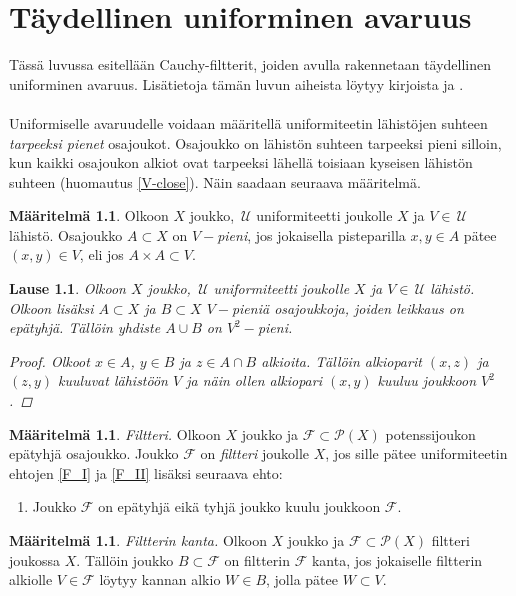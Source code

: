 \documentclass[12pt,a4paper,leqno]{report}
\newcommand{\U}{\,\mathcal{U}}
\newcommand{\Pot}{\mathcal{P}}
\newcommand{\F}{\mathcal{F}}
\theoremstyle{plain}
\newtheorem{lause}[equation]{Lause}
\theoremstyle{definition}
\newtheorem{maar}[equation]{Määritelmä}
\theoremstyle{remark}
\begin{document}
\chapter{Täydellinen uniforminen avaruus}
Tässä luvussa esitellään Cauchy-filtterit, joiden avulla rakennetaan täydellinen uniforminen avaruus.
Lisätietoja tämän luvun aiheista löytyy kirjoista 
\cite[luku~II]{Eom1} ja \cite[luku~IX]{Eom2}.
\\
\\
Uniformiselle avaruudelle voidaan määritellä 
uniformiteetin lähistöjen suhteen \emph{tarpeeksi pienet} osa\-jou\-kot. 
Osajoukko on lähistön suhteen tarpeeksi pieni silloin, 
kun kaikki osa\-jou\-kon alkiot ovat 
tarpeeksi lähellä toisiaan kyseisen lähistön suhteen (huomautus \ref{V-close}). 
Näin saadaan seuraava määritelmä.
\begin{maar}
Olkoon $X$ joukko, $\U$ uniformiteetti joukolle $X$ ja $V\in\U$ lähistö. 
Osajoukko $A\subset X$ on \emph{$V-$pieni}, jos 
jokaisella pisteparilla $x,y\in A$ pätee $(x,y)\in V$, eli jos $A\times A\subset V$.
\end{maar}
\begin{lause}
Olkoon $X$ joukko, $\U$ uniformiteetti joukolle $X$ ja $V\in\U$ lähistö. 
Olkoon lisäksi $A\subset X$ ja $B\subset X$ $V-$pieniä osajoukkoja, 
joiden leikkaus on epätyhjä. 
Tällöin yhdiste $A\cup B$ on $V^2-$pieni.
\begin{proof}
Olkoot $x\in A$, $y\in B$ ja $z\in A\cap B$ alkioita. 
Tällöin alkioparit $(x,z)$ ja $(z,y)$ kuuluvat lähistöön $V$ 
ja näin ollen alkiopari $(x,y)$ kuuluu joukkoon $V^2$.
\end{proof}
\end{lause}
\begin{maar}\label{filtteri_maar}
\emph{Filtteri.} Olkoon $X$ joukko ja $\F\subset \Pot(X)$ potenssijoukon epätyhjä osa\-joukko. 
Joukko $\F$ on \emph{filtteri} joukolle $X$, jos sille pätee 
uniformiteetin ehtojen \ref{F_I} ja \ref{F_II} lisäksi 
seuraava ehto:
\begin{enumerate} [label=(F),ref=(F)]
\item\label{filtteriehto} Joukko $\F$ on epätyhjä eikä tyhjä joukko kuulu joukkoon $\F$.
\end{enumerate} 
\end{maar}
\begin{maar}
\emph{Filtterin kanta.} 
Olkoon $X$ joukko ja $\F\subset \Pot(X)$ filtteri joukossa $X$. 
Tällöin joukko $B\subset \F$ on filtterin $\F$ kanta, 
jos jokaiselle filtterin alkiolle $V\in \F$ 
löytyy kannan alkio $W\in B $, jolla pätee $W\subset V$.
\end{maar}
\end{document}
